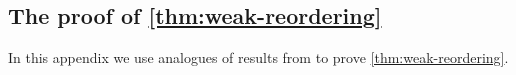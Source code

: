 \documentclass[12pt]{amsart}
\theoremstyle{definition}
\newtheorem{remark}[thm]{Remark}
\DeclareMathOperator{\rev}{rev}
\def\LW#1{(\textcolor{teal}{LW:#1})}
\begin{document}
\begin{appendices}

\section{The proof of \texorpdfstring{\cref{thm:weak-reordering}}{}}\label{app:permuted_basement}
In this appendix we use 
analogues of results from \cite{AlexanderssonSawhney2019,AyyerMartinWilliams2025} to 
prove \cref{thm:weak-reordering}.



    
    



\end{appendices}
\end{document}
